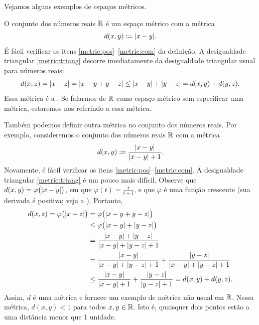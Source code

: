 Vejamos alguns exemplos de espaços métricos.

\begin{example}
O conjunto dos números reais ${\mathbb{R}}$ é um espaço métrico com a métrica
\begin{equation*}
d(x,y) \coloneqq \lvert {x-y} \rvert .
\end{equation*}
É fácil verificar os itens \ref{metric:pos}--\ref{metric:com} da definição.
A desigualdade triangular \ref{metric:triang} decorre imediatamente da
desigualdade triangular usual para números reais:
\begin{equation*}
d(x,z) = \lvert {x-z} \rvert = 
\lvert {x-y+y-z} \rvert \leq
\lvert {x-y} \rvert+\lvert {y-z} \rvert =
d(x,y)+ d(y,z) .
\end{equation*}
Essa métrica é a \emph{}. Se falarmos de ${\mathbb{R}}$
como espaço métrico sem especificar uma métrica, estaremos nos referindo a
essa métrica.
\end{example}

\begin{example}
Também podemos definir outra métrica no conjunto dos números reais.
Por exemplo, consideremos o conjunto dos números reais ${\mathbb{R}}$ com a métrica
\begin{equation*}
d(x,y) \coloneqq
\frac{\lvert {x-y} \rvert}{\lvert {x-y} \rvert+1} .
\end{equation*}
Novamente, é fácil verificar os itens \ref{metric:pos}--\ref{metric:com}.
A desigualdade triangular \ref{metric:triang} é um pouco mais difícil.
Observe que $d(x,y) = \varphi\bigl(\lvert {x-y} \rvert\bigr)$, em que
$\varphi(t) = \frac{t}{t+1}$, e que $\varphi$ é uma função crescente (sua
derivada é positiva; veja a ). Portanto,
\begin{equation*}
\begin{split}
d(x,z) = \varphi\bigl(\lvert {x-z} \rvert\bigr)
& = 
\varphi\bigl(\lvert {x-y+y-z} \rvert\bigr) \\
& \leq
\varphi\bigl(\lvert {x-y} \rvert+\lvert {y-z} \rvert\bigr)
\\
& =
\frac{\lvert {x-y} \rvert+\lvert {y-z} \rvert}{\lvert {x-y} \rvert+\lvert {y-z} \rvert+1} \\
& =
\frac{\lvert {x-y} \rvert}{\lvert {x-y} \rvert+\lvert {y-z} \rvert+1} +
\frac{\lvert {y-z} \rvert}{\lvert {x-y} \rvert+\lvert {y-z} \rvert+1}
\\
& \leq
\frac{\lvert {x-y} \rvert}{\lvert {x-y} \rvert+1} +
\frac{\lvert {y-z} \rvert}{\lvert {y-z} \rvert+1} =
d(x,y)+ d(y,z) .
\end{split}
\end{equation*}
Assim, $d$ é uma métrica e fornece um exemplo de métrica não usual em ${\mathbb{R}}$.
Nessa métrica, $d(x,y) < 1$ para todos $x,y \in {\mathbb{R}}$. Isto é, quaisquer dois
pontos estão a uma distância menor que 1 unidade.
\begin{myfigureht}
\caption{Gráfico de $\frac{t}{t+1}$ para $t$ positivo, com assíntota em 1.\label{fig:tovertp1}}
\end{myfigureht}
\end{example}

